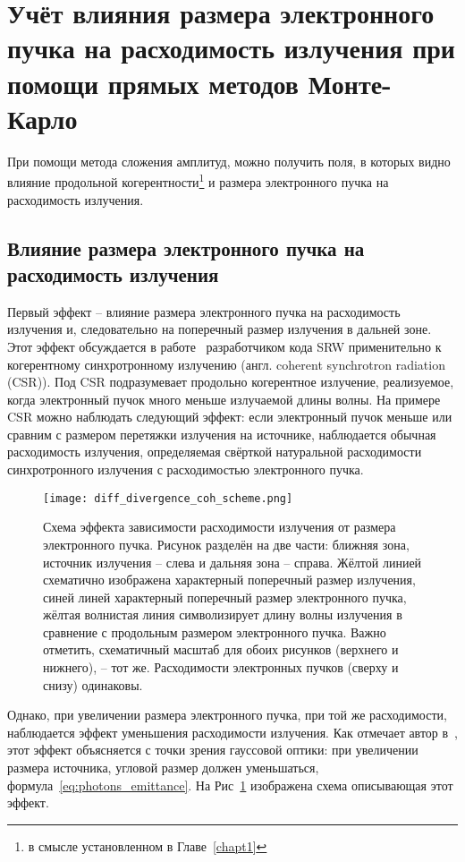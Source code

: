 \section{Учёт влияния размера электронного пучка на расходимость излучения при помощи прямых методов Монте-Карло}
При помощи метода сложения амплитуд, можно получить поля, в которых видно влияние продольной когерентности\footnote{в смысле установленном в Главе~\ref{chapt1}} и размера электронного пучка на расходимость излучения.
\subsection{Влияние размера электронного пучка на расходимость излучения}
Первый эффект -- влияние размера электронного пучка на расходимость излучения и, следовательно на поперечный размер излучения в дальней зоне. Этот эффект обсуждается в работе~\cite{chubar_simulation_2006} разработчиком кода SRW применительно к когерентному синхротронному излучению (англ. coherent synchrotron radiation (CSR)). Под CSR подразумевает продольно когерентное излучение, реализуемое, когда электронный пучок много меньше излучаемой длины волны. На примере CSR можно наблюдать следующий эффект: если электронный пучок меньше или сравним с размером перетяжки излучения на источнике, наблюдается обычная расходимость излучения, определяемая свёрткой натуральной расходимости синхротронного излучения с расходимостью электронного пучка.
\begin{figure}[h!]
	\centering 	\texttt{[image: diff\_divergence\_coh\_scheme.png]}
	\caption{Схема эффекта зависимости расходимости излучения от размера электронного пучка. Рисунок разделён на две части: ближняя зона, источник излучения -- слева и дальняя зона -- справа. Жёлтой линией схематично изображена характерный поперечный размер излучения, синей линей характерный поперечный размер электронного пучка, жёлтая волнистая линия символизирует длину волны излучения в сравнение с продольным размером электронного пучка. Важно отметить, схематичный масштаб для обоих рисунков (верхнего и нижнего), -- тот же. Расходимости электронных пучков (сверху и снизу) одинаковы.}
	\label{fig:diff_divergence_coh_scheme}
\end{figure}
Однако, при увеличении размера электронного пучка, при той же расходимости, наблюдается эффект уменьшения расходимости излучения. Как отмечает автор в~\cite{chubar_simulation_2006}, этот эффект объясняется с точки зрения гауссовой оптики: при увеличении размера источника, угловой размер должен уменьшаться, формула~\ref{eq:photons_emittance}. На Рис~\ref{fig:diff_divergence_coh_scheme} изображена схема описывающая этот эффект.

